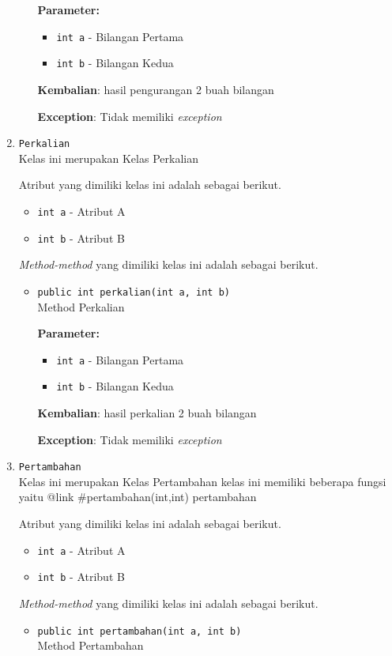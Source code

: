 \documentclass{article}
\begin{document}
\begin{enumerate}
\begin{itemize}
\textbf{Parameter:}
\begin{itemize}
\item \texttt{int a} - 
Bilangan Pertama
\item \texttt{int b} - 
Bilangan Kedua
\end{itemize}
\textbf{Kembalian}: hasil pengurangan 2 buah bilangan

\textbf{Exception}: Tidak memiliki \textit{exception}

\end{itemize}
\item \texttt{Perkalian}\\ 
Kelas ini merupakan Kelas Perkalian

Atribut yang dimiliki kelas ini adalah sebagai berikut.
\begin{itemize}
\item \texttt{int a} - Atribut A
\item \texttt{int b} - Atribut B
\end{itemize}
\textit{Method-method} yang dimiliki kelas ini adalah sebagai berikut.
\begin{itemize}
\item \texttt{public int perkalian(int a, int b)}\\ 
Method Perkalian

\textbf{Parameter:}
\begin{itemize}
\item \texttt{int a} - 
Bilangan Pertama
\item \texttt{int b} - 
Bilangan Kedua
\end{itemize}
\textbf{Kembalian}: hasil perkalian 2 buah bilangan

\textbf{Exception}: Tidak memiliki \textit{exception}

\end{itemize}
\item \texttt{Pertambahan}\\ 
Kelas ini merupakan Kelas Pertambahan
 kelas ini memiliki beberapa fungsi yaitu {@link #pertambahan(int,int) pertambahan}

Atribut yang dimiliki kelas ini adalah sebagai berikut.
\begin{itemize}
\item \texttt{int a} - Atribut A
\item \texttt{int b} - Atribut B
\end{itemize}
\textit{Method-method} yang dimiliki kelas ini adalah sebagai berikut.
\begin{itemize}
\item \texttt{public int pertambahan(int a, int b)}\\ 
Method Pertambahan


\end{itemize}
\end{enumerate}
\end{document}

